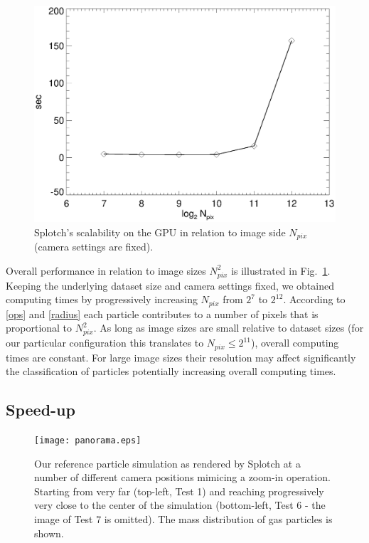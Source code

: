 \documentclass[smallextended]{svjour3}
\begin{document}
\begin{figure}
\includegraphics[scale=0.5]{pixels.eps}
\caption{Splotch's scalability on the GPU in relation to image side $N_{pix}$ (camera settings are fixed).}
\label{fig:pixels}
\end{figure}

Overall performance in relation to image sizes $N_{pix}^2$ is illustrated in Fig.~\ref{fig:pixels}. Keeping the underlying dataset size and camera settings fixed, we obtained computing times by progressively increasing
$N_{pix}$ from ${2}^{7}$ to ${2}^{12}$. According to \eqref{ops} and \eqref{radius} each particle contributes to a number of pixels that is proportional to $N_{pix}^{2}$. As long as image sizes are small relative to dataset sizes (for our particular configuration this translates to $N_{pix} \le 2^{11}$), overall computing times are constant. For large image sizes their resolution may affect significantly the classification of particles potentially increasing overall computing times.

\subsection{Speed-up}
\label{sec:speed-up}
\begin{figure}
\texttt{[image: panorama.eps]}
\caption{Our reference particle simulation as rendered by Splotch at a number of different camera positions mimicing a zoom-in operation. Starting from very far (top-left, Test 1) and reaching progressively very close to the center of the simulation (bottom-left, Test 6 - the image of Test 7 is omitted). The mass distribution of gas particles is shown.}
\label{fig:panorama}
\end{figure}
\end{document}
